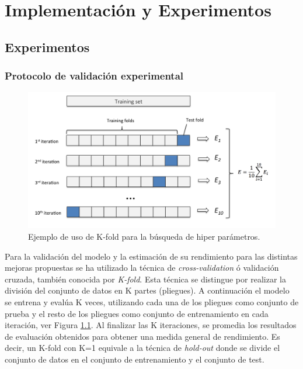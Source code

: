 \chapter{Implementación y Experimentos} 
\section{Experimentos} 
\subsection{Protocolo de validación experimental} 
\label{sec:Validation}

\begin{figure}[htp]
 \begin{center}
   \includegraphics[width=\textwidth]{imagenes/chapter5/cross-validation}
 \end{center}
 \caption{Ejemplo de uso de K-fold para la búsqueda de hiper parámetros.}
 \label{fig:K-fold}
\end{figure}

Para la validación del modelo y la estimación de su rendimiento para las distintas 
mejoras propuestas se ha utilizado la técnica de \emph{cross-validation} ó 
validación cruzada, también conocida por \emph{K-fold}. 
Esta técnica se distingue por realizar la división del conjunto de datos 
en K partes (pliegues). A continuación el modelo se entrena y evalúa K veces, utilizando 
cada una de los pliegues como conjunto de prueba y el resto de los pliegues como 
conjunto de entrenamiento en cada iteración, ver Figura \ref{fig:K-fold}. 
Al finalizar las K iteraciones, se promedia los resultados de evaluación 
obtenidos para obtener una medida general de rendimiento. 
Es decir, un K-fold con K=1 equivale a la técnica de \emph{hold-out} 
donde se divide el conjunto de datos en el conjunto de entrenamiento y 
el conjunto de test.  

